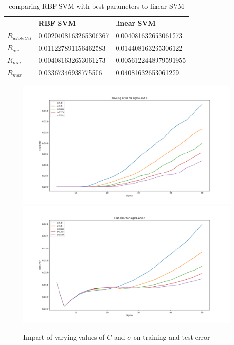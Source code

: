 \begin{table}[!h]
 \begin{center}
\begin{tabular}{|l|l|l|}
 \hline
 & \textbf{RBF SVM} & \textbf{linear SVM} \\
 \hline
  \textbf{$R_{whole Set}$} & 0.0020408163265306367       &     0.004081632653061273      \\
 \hline
  \hline
 \textbf{$R_{avg}$} & 0.011227891156462583       &     0.014408163265306122      \\
 \hline
 \textbf{$R_{min}$} & 0.004081632653061273       &     0.0056122448979591955      \\
 \hline
  \textbf{$R_{max}$} & 0.03367346938775506       &     0.04081632653061229      \\
 \hline

\end{tabular}
\caption{\label{tab:results} comparing RBF SVM with best parameters to linear SVM }
\end{center}
\end{table}
\begin{figure}[h]
\begin{center}
\centering
\includegraphics[width=1\textwidth]{figures/new/3_Figure_4}
\includegraphics[width=1\textwidth]{figures/new/3_Figure_3}
\end{center}
\caption{\label{fig:3_3} Impact of varying values of $C$ and $\sigma$ on training and test error  }
\end{figure}
